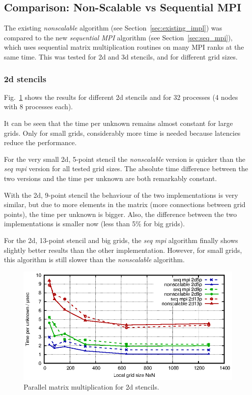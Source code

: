 \subsection{Comparison: Non-Scalable vs Sequential MPI}
The existing \textit{nonscalable} algorithm (see Section~\ref{sec:existing_impl}) was compared to the new \textit{sequential MPI} algorithm (see Section~\ref{sec:seq_mpi}), which uses sequential matrix multiplication routines on many MPI ranks at the same time. This was tested for 2d and 3d stencils, and for different grid sizes.

\subsubsection*{2d stencils}
Fig.~\ref{fig:mat_ex_test_ex2_times_2d} shows the results for different 2d stencils and for 32 processes (4 nodes with 8 processes each). 

It can be seen that the time per unknown remains almost constant for large grids. Only for small grids, considerably more time is needed because latencies reduce the performance.


For the very small 2d, 5-point stencil the \textit{nonscalable} version is quicker than the \textit{seq mpi} version for all tested grid sizes. The absolute time difference between the two versions and the time per unknown are both remarkably constant. 

With the 2d, 9-point stencil the behaviour of the two implementations is very similar, but due to more elements in the matrix (more connections between grid points), the time per unknown is bigger. Also, the difference between the two implementations is smaller now (less than 5\% for big grids). 

For the 2d, 13-point stencil and big grids, the \textit{seq mpi} algorithm finally shows slightly better results than the other implementation. However, for small grids, this algorithm is still slower than the \textit{nonscalable} algorithm. 

\begin{figure}[tbp]
	\centering
	\includegraphics[width=1\textwidth]{times_2d}
	\caption{Parallel matrix multiplication for 2d stencils.} 
	\label{fig:mat_ex_test_ex2_times_2d}
\end{figure}

